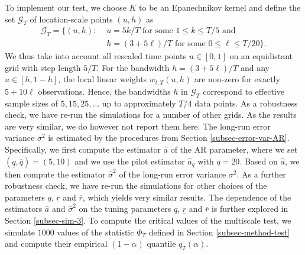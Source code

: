 To implement our test, we choose $K$ to be an Epanechnikov kernel and define the set $\mathcal{G}_T$ of location-scale points $(u,h)$ as
\begin{align}
\mathcal{G}_T = \big\{ (u, h): & \, \, u = 5k/T \text{ for some } 1 \le k \le T/5 \text{ and } \nonumber \\ & \, \, h = (3+5\ell)/T \text{ for some } 0 \le \ell \le T/20 \big\}. \label{grid-sim-app}
\end{align}
We thus take into account all rescaled time points $u \in [0,1]$ on an equidistant grid with step length $5/T$. For the bandwidth $h = (3 + 5\ell)/T$ and any $u \in [h,1-h]$, the local linear weights $w_{t,T}(u,h)$ are non-zero for exactly $5 + 10 \ell$ observations. Hence, the bandwidths $h$ in $\mathcal{G}_T$ correspond to effective sample sizes of $5, 15, 25, \ldots$ up to approximately $T/4$ data points. As a robustness check, we have re-run the simulations for a number of other grids. As the results are very similar, we do however not report them here. The long-run error variance $\sigma^2$ is estimated by the procedures from Section \ref{subsec-error-var-AR}. Specifically, we first compute the estimator $\widehat{a}$ of the AR parameter, where we set $(\underline{q},\overline{q}) = (5,10)$ and we use the pilot estimator $\widehat{a}_q$ with $q = 20$. Based on $\widehat{a}$, we then compute the estimator $\widehat{\sigma}^2$ of the long-run error variance $\sigma^2$. As a further robustness check, we have re-run the simulations for other choices of the parameters $q$, $\underline{r}$ and $\overline{r}$, which yields very similar results. The dependence of the estimators $\widehat{a}$ and $\widehat{\sigma}^2$ on the tuning parameters $q$, $\underline{r}$ and $\overline{r}$ is further explored in Section \ref{subsec-sim-3}. To compute the critical values of the multiscale test, we simulate $1000$ values of the statistic $\Phi_T$ defined in Section \ref{subsec-method-test} and compute their empirical $(1-\alpha)$ quantile $q_T(\alpha)$. 


